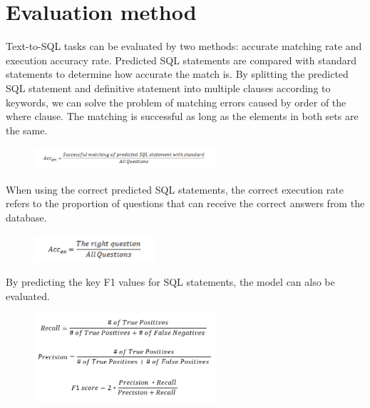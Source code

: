 \section{Evaluation method}

Text-to-SQL tasks can be evaluated by two methods: accurate matching rate and execution accuracy rate. Predicted SQL statements are compared with standard statements to determine how accurate the match is.
By splitting the predicted SQL statement and definitive statement into multiple clauses according to keywords, we can solve the problem of matching errors caused by order of the where clause. The matching is successful as long as the elements in both sets are the same.

\begin{figure}[htb]
    \centering
    \includegraphics[width=0.6\textwidth]{pics/acc1.png}
    \label{fig:acc1}
\end{figure}

When using the correct predicted SQL statements, the correct execution rate refers to the proportion of questions that can receive the correct answers from the database.

\begin{figure}[htb]
    \centering
    \includegraphics[width=0.4\textwidth]{pics/acc2.png}
    \label{fig:acc2}
\end{figure}

By predicting the key F1 values for SQL statements, the model can also be evaluated.

\begin{figure}[htb]
    \centering
    \includegraphics[width=0.6\textwidth]{pics/f1.png}
    \label{fig:f1}
\end{figure}